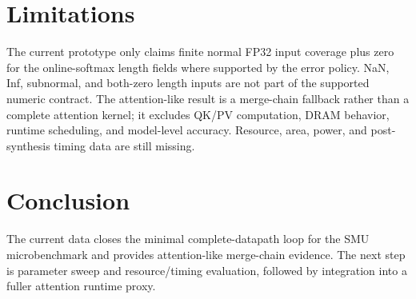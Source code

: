 \documentclass[conference]{IEEEtran}
\begin{document}
\section{Limitations}

The current prototype only claims finite normal FP32 input coverage plus zero
for the online-softmax length fields where supported by the error policy. NaN,
Inf, subnormal, and both-zero length inputs are not part of the supported
numeric contract. The attention-like result is a merge-chain fallback rather
than a complete attention kernel; it excludes QK/PV computation, DRAM behavior,
runtime scheduling, and model-level accuracy. Resource, area, power, and
post-synthesis timing data are still missing.

\section{Conclusion}

The current data closes the minimal complete-datapath loop for the SMU
microbenchmark and provides attention-like merge-chain evidence. The next step
is parameter sweep and resource/timing evaluation, followed by integration into
a fuller attention runtime proxy.



\end{document}
